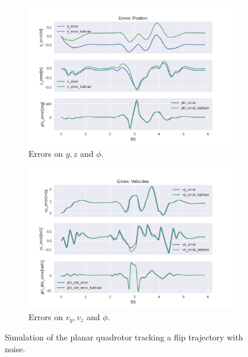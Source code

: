 \documentclass{thesisreport}
\begin{document}
\begin{figure}[H]
\medskip
	\begin{subfigure}{0.48\textwidth}
		\includegraphics[width=\linewidth]{Images/acados_simulations/flip_trajectory/planar_quadrotor/noisy/Errors_position.png}
		\caption{Errors on $y,z$ and $\phi$.} \label{fig:flip_planar_sim_error_pose_noisy}
	\end{subfigure}\hspace*{\fill}
	\begin{subfigure}{0.48\textwidth}
		\includegraphics[width=\linewidth]{Images/acados_simulations/flip_trajectory/planar_quadrotor/noisy/Errors_velocities.png}
		\caption{Errors on $v_y,v_z$ and $\dot{\phi}$.} \label{fig:flip_planar_sim_error_velocities_noisy}
	\end{subfigure}

	\caption{Simulation of the planar quadrotor tracking a flip trajectory with noise.} \label{fig:flip_planar_sim_noisy}
\end{figure}
\end{document}
